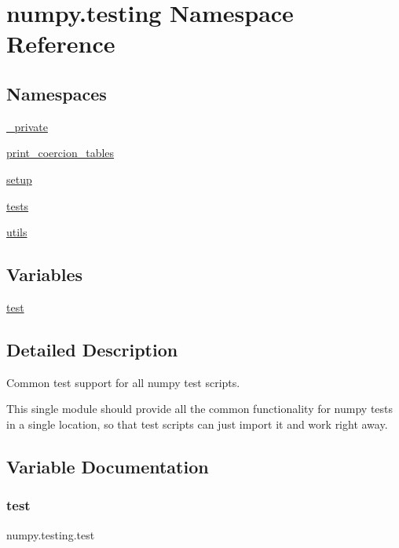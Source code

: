 \hypertarget{namespacenumpy_1_1testing}{}\section{numpy.\+testing Namespace Reference}
\label{namespacenumpy_1_1testing}
\subsection*{Namespaces}
\begin{DoxyCompactItemize}
\item 
 \hyperlink{namespacenumpy_1_1testing_1_1__private}{\+\_\+private}
\item 
 \hyperlink{namespacenumpy_1_1testing_1_1print__coercion__tables}{print\+\_\+coercion\+\_\+tables}
\item 
 \hyperlink{namespacenumpy_1_1testing_1_1setup}{setup}
\item 
 \hyperlink{namespacenumpy_1_1testing_1_1tests}{tests}
\item 
 \hyperlink{namespacenumpy_1_1testing_1_1utils}{utils}
\end{DoxyCompactItemize}
\subsection*{Variables}
\begin{DoxyCompactItemize}
\item 
\hyperlink{namespacenumpy_1_1testing_a6e95cdd7f4d6021fbb8519b9f868c27b}{test}
\end{DoxyCompactItemize}


\subsection{Detailed Description}
\begin{DoxyVerb}Common test support for all numpy test scripts.

This single module should provide all the common functionality for numpy tests
in a single location, so that test scripts can just import it and work right
away.\end{DoxyVerb}
 

\subsection{Variable Documentation}
\mbox{\label{namespacenumpy_1_1testing_a6e95cdd7f4d6021fbb8519b9f868c27b}} 
\subsubsection{\texorpdfstring{test}{test}}
{\footnotesize\ttfamily numpy.\+testing.\+test}

